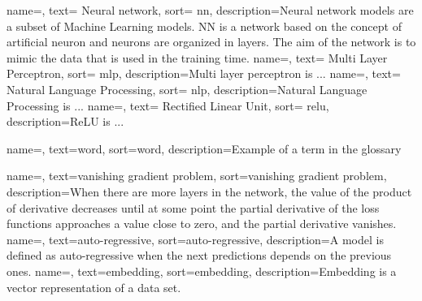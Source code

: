 {
    name=,
    text= Neural network,
    sort= nn,
    description={Neural network models are a subset of Machine Learning models. NN is a network based on the concept of artificial neuron and neurons are organized in layers. The aim of the network is to mimic the data that is used in the training time. }
}
{
    name=,
    text= Multi Layer Perceptron,
    sort= mlp,
    description={Multi layer perceptron is ...}
}
{
    name=,
    text= Natural Language Processing,
    sort= nlp,
    description={Natural Language Processing is ...}
}
{
    name=,
    text= Rectified Linear Unit,
    sort= relu,
    description={ReLU is ...} %
}



{
    name=,
    text=word,
    sort=word,
    description={Example of a term in the glossary}
}

{
    name=,
    text=vanishing gradient problem,
    sort=vanishing gradient problem,
    description={When there are more layers in the network, the value of the product of derivative decreases until at some point the partial derivative of the loss functions approaches a value close to zero, and the partial derivative vanishes.}
}
{
    name=,
    text=auto-regressive,
    sort=auto-regressive,
    description={A model is defined as auto-regressive when the next predictions depends on the previous ones.} %
}
{
    name=,
    text=embedding,
    sort=embedding,
    description={Embedding is a vector representation of a data set.}
}
